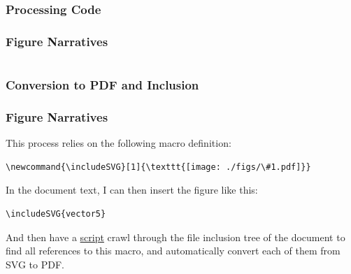 {\begin{frame}[fragile]
\end{frame}

\subsubsection{Processing Code}
\begin{frame}[fragile]
  \frametitle{Figure Narratives }
  \vspace{3mm}
  \begin{multicols}{2}
    \inputminted[fontsize=\tiny]{python}{../bin/process-vector.py}
  \end{multicols}
\end{frame}

\subsubsection{Conversion to PDF and Inclusion}
\begin{frame}[fragile]
  \frametitle{Figure Narratives }
  \vspace{3mm}
  This process relies on the following macro definition:
  \begin{verbatim}
\newcommand{\includeSVG}[1]{\texttt{[image: ./figs/\#1.pdf]}}
  \end{verbatim}
  
  \vspace{5mm}
  In the document text, I can then insert the figure like this:
  \begin{verbatim}
\includeSVG{vector5}
  \end{verbatim}
  
  \pause
  \vspace{5mm}
  And then have a \textcolor{blue}{\href{https://github.com/aslakjohansen/prosa-latex/blob/main/bin/generate-tex-includes}{script}} crawl through the file inclusion tree of the document to find all references to this macro, and automatically convert each of them from SVG to PDF.
\end{frame}

}
